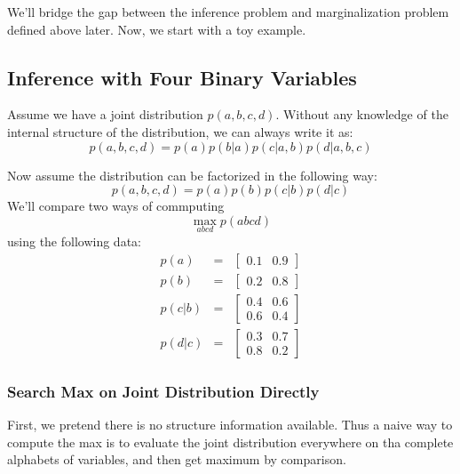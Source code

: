 We'll bridge the gap between the inference problem and marginalization problem 
defined above later. Now, we start with a toy example. 

\subsection{Inference with Four Binary Variables}

Assume we have a joint distribution $p(a,b,c,d)$. 
Without any knowledge of the internal structure of the distribution, 
we can always write it as:
\begin{equation}
	p(a,b,c,d) = p(a)p(b|a)p(c|a,b)p(d|a,b,c)
\end{equation}

Now assume the distribution can be factorized in the following way:
\begin{equation}
	p(a,b,c,d) = p(a)p(b)p(c|b)p(d|c)
	\label{eq:toy_chain}
\end{equation}
We'll compare two ways of commputing \
$$\max_{abcd}{p(abcd)}$$
 using the following data:
\begin{eqnarray}
	p(a) &=& \left[
	\begin{matrix}
	0.1 & 0.9
	\end{matrix}
	\right] \\
	p(b) &=& \left[
	\begin{matrix}
	0.2 & 0.8
	\end{matrix}
	\right] \\
	p(c|b) &=& \left[
	\begin{matrix}
	0.4 & 0.6 \\
	0.6 & 0.4
	\end{matrix}
	\right] \\
	p(d|c) &=& \left[
	\begin{matrix}
	0.3 & 0.7 \\
	0.8 & 0.2
	\end{matrix}
	\right] 
\end{eqnarray}

\subsubsection{Search Max on Joint Distribution Directly}
First, we pretend there is no structure information available. 
Thus a naive way to compute the max is to evaluate the joint distribution 
everywhere on tha complete alphabets of variables, and then get 
maximum by comparison. 


